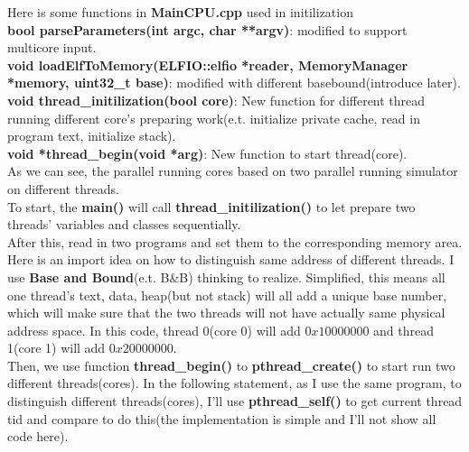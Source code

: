 \mathbb{R} \documentclass{article}
\begin{document}
Here is some functions in \textbf{MainCPU.cpp} used in initilization\\
\textcolor[rgb]{0,0,1}{\textbf{bool parseParameters(int argc, char **argv)}}: modified to support multicore input.\\
\textcolor[rgb]{0,0,1}{\textbf{void loadElfToMemory(ELFIO::elfio *reader, MemoryManager *memory, uint32\_t base)}}: modified with different basebound(introduce later).\\
\textcolor[rgb]{0,0,1}{\textbf{void thread\_initilization(bool core)}}: New function for different thread running different core's preparing work(e.t. initialize private cache, read in program text, initialize stack).\\
\textcolor[rgb]{0,0,1}{\textbf{void *thread\_begin(void *arg)}}: New function to start thread(core).\\
As we can see, the parallel running cores based on two parallel running simulator on different threads. \\
To start, the \textbf{main()} will call \textbf{thread\_initilization()} to let prepare two threads' variables and classes sequentially. \\
After this, read in two programs and set them to the corresponding memory area. Here is an import idea on how to distinguish same address of different threads. I use \textbf{Base and Bound}(e.t. B\&B) thinking to realize. Simplified, this means all one thread's text, data, heap(but not stack) will all add a unique base number, which will make sure that the two threads will not have actually same physical address space. In this code, thread 0(core 0) will add $0x10000000$ and thread 1(core 1) will add $0x20000000$.\\
Then, we use function \textbf{thread\_begin()} to \textbf{pthread\_create()} to start run two different threads(cores). In the following statement, as I use the same program, to distinguish different threads(cores), I'll use \textbf{pthread\_self()} to get current thread tid and compare to do this(the implementation is simple and I'll not show all code here).\\
\end{document}
